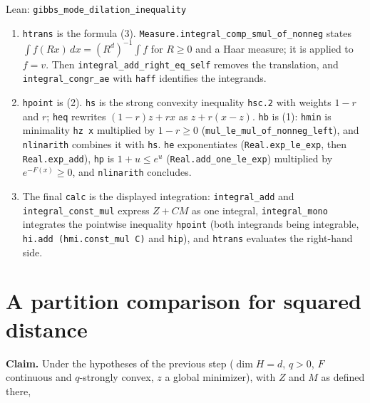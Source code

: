 \documentclass[11pt,a4paper]{article}
\begin{document}
\begin{leanbox}{Lean: \texttt{gibbs\_\allowbreak{}mode\_\allowbreak{}dilation\_\allowbreak{}inequality}}
\begin{enumerate}
\item \texttt{htrans} is the formula (3). \texttt{Measure.\allowbreak{}integral\_\allowbreak{}comp\_\allowbreak{}smul\_\allowbreak{}of\_\allowbreak{}nonneg} states \(\int f(Rx)\,dx=(R^d)^{-1}\int f\) for \(R\ge0\) and a Haar measure; it is applied to \(f=v\). Then \texttt{integral\_\allowbreak{}add\_\allowbreak{}right\_\allowbreak{}eq\_\allowbreak{}self} removes the translation, and \texttt{integral\_\allowbreak{}congr\_\allowbreak{}ae} with \texttt{haff} identifies the integrands.

\item \texttt{hpoint} is (2). \texttt{hs} is the strong convexity inequality \texttt{hsc.\allowbreak{}2} with weights \(1-r\) and \(r\); \texttt{heq} rewrites \((1-r)z+rx\) as \(z+r(x-z)\). \texttt{hb} is (1): \texttt{hmin} is minimality \texttt{hz x} multiplied by \(1-r\ge0\) (\texttt{mul\_\allowbreak{}le\_\allowbreak{}mul\_\allowbreak{}of\_\allowbreak{}nonneg\_\allowbreak{}left}), and \texttt{nlinarith} combines it with \texttt{hs}. \texttt{he} exponentiates (\texttt{Real.\allowbreak{}exp\_\allowbreak{}le\_\allowbreak{}exp}, then \texttt{Real.\allowbreak{}exp\_\allowbreak{}add}), \texttt{hp} is \(1+u\le e^u\) (\texttt{Real.\allowbreak{}add\_\allowbreak{}one\_\allowbreak{}le\_\allowbreak{}exp}) multiplied by \(e^{-F(x)}\ge0\), and \texttt{nlinarith} concludes.

\item The final \texttt{calc} is the displayed integration: \texttt{integral\_\allowbreak{}add} and \texttt{integral\_\allowbreak{}const\_\allowbreak{}mul} express \(Z+CM\) as one integral, \texttt{integral\_\allowbreak{}mono} integrates the pointwise inequality \texttt{hpoint} (both integrands being integrable, \texttt{hi.\allowbreak{}add (hmi.\allowbreak{}const\_\allowbreak{}mul C)} and \texttt{hip}), and \texttt{htrans} evaluates the right-hand side.

\end{enumerate}
\end{leanbox}

\section{\texorpdfstring{A partition comparison for squared distance}{A partition comparison for squared distance}}


\textbf{Claim.} Under the hypotheses of the previous step (\(\dim H=d\), \(q>0\), \(F\) continuous and \(q\)-strongly convex, \(z\) a global minimizer), with \(Z\) and \(M\) as defined there,
\end{document}
